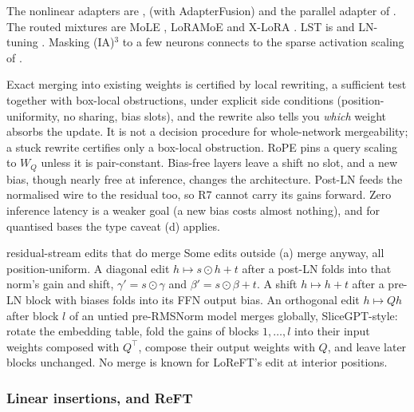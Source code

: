 The nonlinear adapters are \citet{houlsby2019parameter}, \citet{pfeiffer2020adapterfusion} (with AdapterFusion) and the
parallel adapter of \citet{he2021unified}. The routed mixtures are MoLE \citep{wu2024mixture}, LoRAMoE
\citep{dou2023loramoe} and X-LoRA \citep{buehler2024x}. LST is \citet{sung2022lst} and LN-tuning \citet{zhao2023tuning}.
Masking (IA)$^3$ to a few neurons connects to the sparse activation scaling of \citet{xstoehr2024activation}.

\begin{explains}
Exact merging into existing weights is certified by local rewriting, a sufficient test together with box-local
obstructions, under explicit side conditions (position-uniformity, no sharing, bias slots), and the rewrite also tells
you \emph{which} weight absorbs the update. It is not a decision procedure for whole-network mergeability; a stuck rewrite
certifies only a box-local obstruction. RoPE pins a query scaling to $W_Q$ unless it is pair-constant. Bias-free layers
leave a shift no slot, and a new bias, though nearly free at inference, changes the architecture. Post-LN feeds the
normalised wire to the residual too, so R7 cannot carry its gains forward. Zero inference latency is a weaker goal (a new
bias costs almost nothing), and for quantised bases the type caveat (d) applies.
\end{explains}

\begin{remark*}{residual-stream edits that do merge}
Some edits outside (a) merge anyway, all position-uniform. A diagonal edit $h\mapsto s\odot h+t$ after a post-LN folds
into that norm's gain and shift, $\gamma'=s\odot\gamma$ and $\beta'=s\odot\beta+t$. A shift $h\mapsto h+t$ after a pre-LN
block with biases folds into its FFN output bias. An orthogonal edit $h\mapsto Qh$ after block $l$ of an untied
pre-RMSNorm model merges globally, SliceGPT-style: rotate the embedding table, fold the gains of blocks $1,\dots,l$ into
their input weights composed with $Q^\top$, compose their output weights with $Q$, and leave later blocks unchanged. No
merge is known for LoReFT's edit at interior positions.
\end{remark*}

\subsubsection{Linear insertions, and ReFT}\label{sec:merge-reft}

